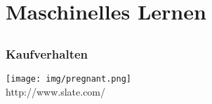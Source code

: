 \documentclass[12pt]{beamer}
\begin{document}
\section{Maschinelles Lernen}
\subsection{}

\begin{frame}
  \frametitle{Kaufverhalten}
  \pause
  \begin{center}
    \texttt{[image: img/pregnant.png]} \\
    \tiny http://www.slate.com/
  \end{center}
\end{frame}
\end{document}
